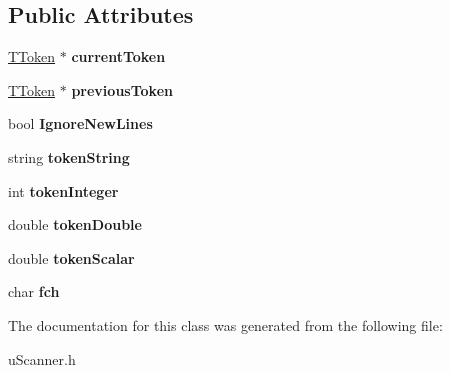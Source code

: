 \subsection*{Public Attributes}
\begin{DoxyCompactItemize}
\item 
\hypertarget{classu_scanner_1_1_t_scanner_ac31fdca5cc61f0f4270f0266d3b1d07b}{\hyperlink{classu_scanner_1_1_t_token}{T\-Token} $\ast$ {\bfseries current\-Token}}\label{classu_scanner_1_1_t_scanner_ac31fdca5cc61f0f4270f0266d3b1d07b}

\item 
\hypertarget{classu_scanner_1_1_t_scanner_a09cf1f2aa40f0413e23b8c0349dd7f3d}{\hyperlink{classu_scanner_1_1_t_token}{T\-Token} $\ast$ {\bfseries previous\-Token}}\label{classu_scanner_1_1_t_scanner_a09cf1f2aa40f0413e23b8c0349dd7f3d}

\item 
\hypertarget{classu_scanner_1_1_t_scanner_af7409fa141bb437a4b6ba8bba4b5189a}{bool {\bfseries Ignore\-New\-Lines}}\label{classu_scanner_1_1_t_scanner_af7409fa141bb437a4b6ba8bba4b5189a}

\item 
\hypertarget{classu_scanner_1_1_t_scanner_a3aa352c805fb9cc78dbd2101d1b2db63}{string {\bfseries token\-String}}\label{classu_scanner_1_1_t_scanner_a3aa352c805fb9cc78dbd2101d1b2db63}

\item 
\hypertarget{classu_scanner_1_1_t_scanner_a12880abca688d7092970a44704b07b6f}{int {\bfseries token\-Integer}}\label{classu_scanner_1_1_t_scanner_a12880abca688d7092970a44704b07b6f}

\item 
\hypertarget{classu_scanner_1_1_t_scanner_ab92e98307396c678052b88f1c33bd4f5}{double {\bfseries token\-Double}}\label{classu_scanner_1_1_t_scanner_ab92e98307396c678052b88f1c33bd4f5}

\item 
\hypertarget{classu_scanner_1_1_t_scanner_a02c84db29558cfa7e75c8d5f1306e3df}{double {\bfseries token\-Scalar}}\label{classu_scanner_1_1_t_scanner_a02c84db29558cfa7e75c8d5f1306e3df}

\item 
\hypertarget{classu_scanner_1_1_t_scanner_a15893da32d57bd0fc63a4df5c038c42c}{char {\bfseries fch}}\label{classu_scanner_1_1_t_scanner_a15893da32d57bd0fc63a4df5c038c42c}

\end{DoxyCompactItemize}


The documentation for this class was generated from the following file\-:\begin{DoxyCompactItemize}
\item 
u\-Scanner.\-h\end{DoxyCompactItemize}
